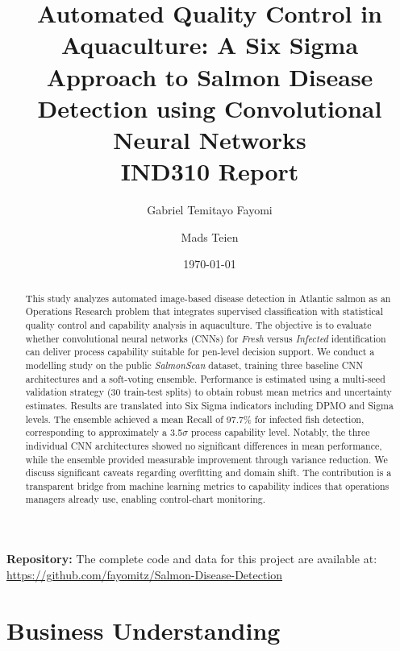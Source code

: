 \documentclass[12pt,a4paper]{article}
\title{\textbf{Automated Quality Control in Aquaculture: A Six Sigma Approach to Salmon Disease Detection using Convolutional Neural Networks}\\[6pt]
{\large IND310 Report}}
\author[1]{Gabriel Temitayo Fayomi}
\author[1]{Mads Teien}
\affil[1]{Norwegian University of Life Sciences, REALTEK, Industrial Economics (INDØK)}
\date{\today}
\begin{document}

\maketitle

\begin{abstract}
This study analyzes automated image-based disease detection in Atlantic salmon as an Operations Research problem that integrates supervised classification with statistical quality control and capability analysis in aquaculture. The objective is to evaluate whether convolutional neural networks (CNNs) for \emph{Fresh} versus \emph{Infected} identification can deliver process capability suitable for pen-level decision support. We conduct a modelling study on the public \emph{SalmonScan} dataset, training three baseline CNN architectures and a soft-voting ensemble. Performance is estimated using a multi-seed validation strategy (30 train-test splits) to obtain robust mean metrics and uncertainty estimates. Results are translated into Six Sigma indicators including DPMO and Sigma levels. The ensemble achieved a mean Recall of 97.7\% for infected fish detection, corresponding to approximately a 3.5$\sigma$ process capability level. Notably, the three individual CNN architectures showed no significant differences in mean performance, while the ensemble provided measurable improvement through variance reduction. We discuss significant caveats regarding overfitting and domain shift. The contribution is a transparent bridge from machine learning metrics to capability indices that operations managers already use, enabling control-chart monitoring.
\end{abstract}

\vspace{0.5cm}
\noindent\textbf{Repository:} The complete code and data for this project are available at: \url{https://github.com/fayomitz/Salmon-Disease-Detection}

\tableofcontents
\clearpage
\listoffigures
\listoftables
\clearpage


\section{Business Understanding}
\end{document}
